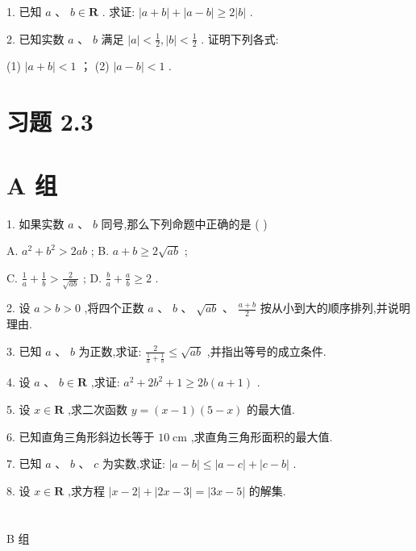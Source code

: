 \documentclass[10pt]{article}
\begin{document}
1. 已知 \(a\text{ 、 }b \in  \mathbf{R}\) . 求证: \(\left| {a + b}\right|  + \left| {a - b}\right|  \geq  2\left| b\right|\) .

2. 已知实数 \(a\text{ 、 }b\) 满足 \(\left| a\right|  < \frac{1}{2},\left| b\right|  < \frac{1}{2}\) . 证明下列各式:

(1) \(\left| {a + b}\right|  < 1\) ； (2) \(\left| {a - b}\right|  < 1\) .

\section*{习题 2.3}

\section*{A 组}

1. 如果实数 \(a\text{ 、 }b\) 同号,那么下列命题中正确的是 ( )

A. \({a}^{2} + {b}^{2} > {2ab}\) ; B. \(a + b \geq  2\sqrt{ab}\) ;

C. \(\frac{1}{a} + \frac{1}{b} > \frac{2}{\sqrt{ab}}\) ; D. \(\frac{b}{a} + \frac{a}{b} \geq  2\) .

2. 设 \(a > b > 0\) ,将四个正数 \(a\text{ 、 }b\text{ 、 }\sqrt{ab}\text{ 、 }\frac{a + b}{2}\) 按从小到大的顺序排列,并说明理由.

3. 已知 \(a\text{ 、 }b\) 为正数,求证: \(\frac{2}{\frac{1}{a} + \frac{1}{b}} \leq  \sqrt{ab}\) ,并指出等号的成立条件.

4. 设 \(a\text{ 、 }b \in  \mathbf{R}\) ,求证: \({a}^{2} + 2{b}^{2} + 1 \geq  {2b}\left( {a + 1}\right)\) .

5. 设 \(x \in  \mathbf{R}\) ,求二次函数 \(y = \left( {x - 1}\right) \left( {5 - x}\right)\) 的最大值.

6. 已知直角三角形斜边长等于 \({10}\mathrm{\;{cm}}\) ,求直角三角形面积的最大值.

7. 已知 \(a\text{ 、 }b\text{ 、 }c\) 为实数,求证: \(\left| {a - b}\right|  \leq  \left| {a - c}\right|  + \left| {c - b}\right|\) .

8. 设 \(x \in  \mathbf{R}\) ,求方程 \(\left| {x - 2}\right|  + \left| {{2x} - 3}\right|  = \left| {{3x} - 5}\right|\) 的解集.

\section*{}



B 组
\end{document}
